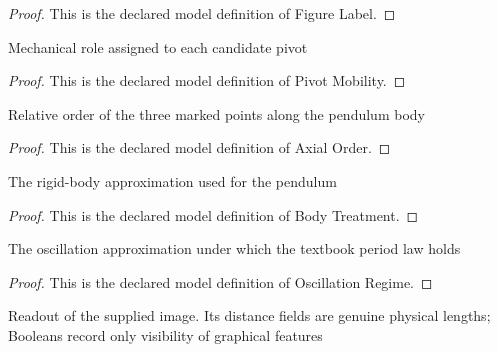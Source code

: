 \begin{proof}
  This is the declared model definition of Figure Label.
\end{proof}
\begin{definition}
  \label{def:physics:phyx-mini-0282:phyxminiproblems-problemphyxmini0282-pivotmobility}
  Mechanical role assigned to each candidate pivot
\end{definition}
\begin{proof}
  This is the declared model definition of Pivot Mobility.
\end{proof}
\begin{definition}
  \label{def:physics:phyx-mini-0282:phyxminiproblems-problemphyxmini0282-axialorder}
  Relative order of the three marked points along the pendulum body
\end{definition}
\begin{proof}
  This is the declared model definition of Axial Order.
\end{proof}
\begin{definition}
  \label{def:physics:phyx-mini-0282:phyxminiproblems-problemphyxmini0282-bodytreatment}
  The rigid-body approximation used for the pendulum
\end{definition}
\begin{proof}
  This is the declared model definition of Body Treatment.
\end{proof}
\begin{definition}
  \label{def:physics:phyx-mini-0282:phyxminiproblems-problemphyxmini0282-oscillationregime}
  The oscillation approximation under which the textbook period law holds
\end{definition}
\begin{proof}
  This is the declared model definition of Oscillation Regime.
\end{proof}
\begin{definition}
  \label{def:physics:phyx-mini-0282:phyxminiproblems-problemphyxmini0282-reversiblependulumfigure}
  Readout of the supplied image. Its distance fields are genuine physical lengths; Booleans record only visibility of graphical features
\end{definition}
